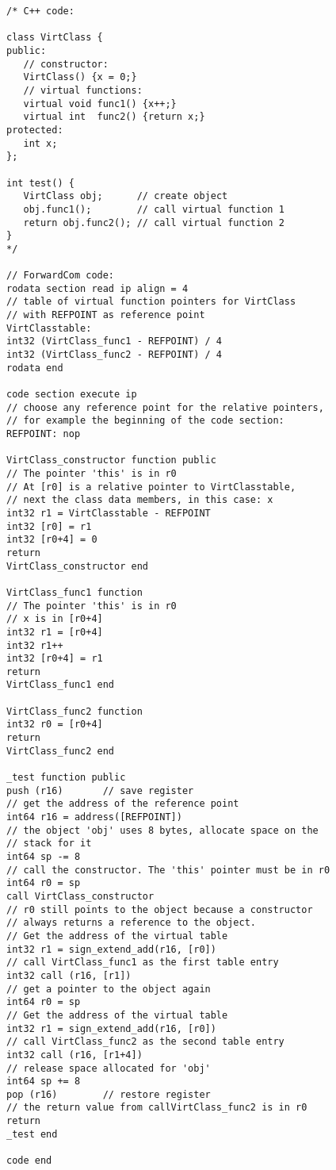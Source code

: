 \documentclass[forwardcom.tex]{subfiles}
\begin{document}
\begin{example}
\label{exampleVirtualFunctions}
\end{example}
\begin{lstlisting}[frame=single]
/* C++ code:

class VirtClass {
public:
   // constructor:
   VirtClass() {x = 0;}
   // virtual functions:
   virtual void func1() {x++;}
   virtual int  func2() {return x;}
protected:
   int x;
};

int test() {
   VirtClass obj;      // create object
   obj.func1();        // call virtual function 1
   return obj.func2(); // call virtual function 2
}
*/

// ForwardCom code:
rodata section read ip align = 4
// table of virtual function pointers for VirtClass
// with REFPOINT as reference point
VirtClasstable:
int32 (VirtClass_func1 - REFPOINT) / 4
int32 (VirtClass_func2 - REFPOINT) / 4
rodata end

code section execute ip
// choose any reference point for the relative pointers, 
// for example the beginning of the code section:
REFPOINT: nop

VirtClass_constructor function public
// The pointer 'this' is in r0
// At [r0] is a relative pointer to VirtClasstable,
// next the class data members, in this case: x
int32 r1 = VirtClasstable - REFPOINT
int32 [r0] = r1
int32 [r0+4] = 0
return
VirtClass_constructor end

VirtClass_func1 function
// The pointer 'this' is in r0
// x is in [r0+4]
int32 r1 = [r0+4]
int32 r1++
int32 [r0+4] = r1
return
VirtClass_func1 end

VirtClass_func2 function
int32 r0 = [r0+4]
return
VirtClass_func2 end

_test function public
push (r16)       // save register
// get the address of the reference point
int64 r16 = address([REFPOINT])
// the object 'obj' uses 8 bytes, allocate space on the 
// stack for it
int64 sp -= 8
// call the constructor. The 'this' pointer must be in r0
int64 r0 = sp
call VirtClass_constructor
// r0 still points to the object because a constructor 
// always returns a reference to the object.
// Get the address of the virtual table
int32 r1 = sign_extend_add(r16, [r0])
// call VirtClass_func1 as the first table entry
int32 call (r16, [r1])
// get a pointer to the object again
int64 r0 = sp
// Get the address of the virtual table
int32 r1 = sign_extend_add(r16, [r0])
// call VirtClass_func2 as the second table entry
int32 call (r16, [r1+4])
// release space allocated for 'obj'
int64 sp += 8
pop (r16)        // restore register
// the return value from callVirtClass_func2 is in r0
return
_test end

code end
\end{lstlisting}
\vspace{4mm}
\end{document}
